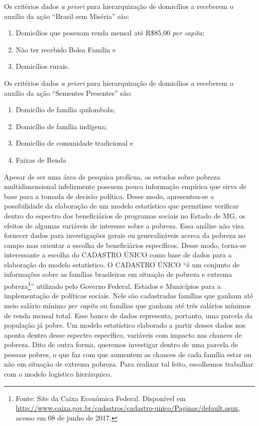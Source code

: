 \documentclass[a4paper, 12pt, openright, oneside, english, brazil, article]{abntex2}
\begin{document}
	Os critérios dados \textit{a priori} para hierarquização de domicílios a receberem o auxílio da ação ``Brasil sem Miséria'' são:
	
	\begin{enumerate}
		\item Domicílios que possuam renda mensal até R\$85,00 \textit{per capita};
		\item Não ter recebido Bolsa Família e
		\item Domicílios rurais.
	\end{enumerate}

	Os critérios dados \textit{a priori} para hierarquização de domicílios a receberem o auxílio da ação ``Sementes Presentes'' são:
	
	\begin{enumerate}
		\item Domicílio de família quilombola;
		\item Domicílio de família indígena;
		\item Domicílio de comunidade tradicional e
		\item Faixas de Renda
	\end{enumerate}

	Apesar de ser uma área de pesquisa profícua, os estudos sobre pobreza multidimensional infelizmente possuem pouca informação empírica que sirva de base para a tomada de decisão política. Desse modo, apresentou-se a possibilidade da elaboração de um modelo estatístico que permitisse verificar dentro do espectro dos beneficiários de programas sociais no Estado de MG, os efeitos de algumas variáveis de interesse sobre a pobreza. Essa análise não visa fornecer dados para investigações gerais ou generalizáveis acerca da pobreza no campo mas orientar a escolha de beneficiários específicos. Desse modo, torna-se interessante a escolha do CADASTRO ÚNICO como base de dados para a elaboração do modelo estatístico. O CADASTRO ÚNICO ``é um conjunto de informações sobre as famílias brasileiras em situação de pobreza e extrema pobreza\footnote{Fonte: Site da Caixa Econômica Federal. Disponível em \url{http://www.caixa.gov.br/cadastros/cadastro-unico/Paginas/default.aspx}, acesso em 08 de junho de 2017.}'' utilizado pelo Governo Federal, Estados e Municípios para a implementação de políticas sociais. Nele são cadastradas famílias que ganham até meio salário mínimo \textit{per capita} ou famílias que ganham até três salários mínimos de renda mensal total. Esse banco de dados representa, portanto, uma parcela da população já pobre. Um modelo estatístico elaborado a partir desses dados nos aponta dentro desse espectro específico, variáveis com impacto nas chances de pobreza. Dito de outra forma, queremos investigar dentro de uma parcela de pessoas pobres, o que faz com que aumentem as chances de cada família estar ou não em situação de extrema pobreza. Para realizar tal feito, escolhemos trabalhar com o modelo logístico hierárquico.
	
\end{document}
